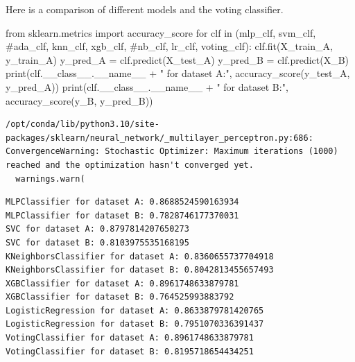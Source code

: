 \documentclass[
  letterpaper,
  DIV=11,
  numbers=noendperiod]{scrartcl}
\newenvironment{Shaded}{\begin{snugshade}}{\end{snugshade}}
\newcommand{\BuiltInTok}[1]{\textcolor[rgb]{0.00,0.23,0.31}{#1}}
\newcommand{\CommentTok}[1]{\textcolor[rgb]{0.37,0.37,0.37}{#1}}
\newcommand{\ControlFlowTok}[1]{\textcolor[rgb]{0.00,0.23,0.31}{#1}}
\newcommand{\ImportTok}[1]{\textcolor[rgb]{0.00,0.46,0.62}{#1}}
\newcommand{\KeywordTok}[1]{\textcolor[rgb]{0.00,0.23,0.31}{#1}}
\newcommand{\NormalTok}[1]{\textcolor[rgb]{0.00,0.23,0.31}{#1}}
\newcommand{\OperatorTok}[1]{\textcolor[rgb]{0.37,0.37,0.37}{#1}}
\newcommand{\StringTok}[1]{\textcolor[rgb]{0.13,0.47,0.30}{#1}}
\newcommand{\VariableTok}[1]{\textcolor[rgb]{0.07,0.07,0.07}{#1}}
\begin{document}
Here is a comparison of different models and the voting classifier.

\begin{Shaded}
\begin{Highlighting}[]
\ImportTok{from}\NormalTok{ sklearn.metrics }\ImportTok{import}\NormalTok{ accuracy\_score}
\ControlFlowTok{for}\NormalTok{ clf }\KeywordTok{in}\NormalTok{ (mlp\_clf, svm\_clf, }\CommentTok{\#ada\_clf,}
\NormalTok{            knn\_clf, xgb\_clf, }\CommentTok{\#nb\_clf,}
\NormalTok{            lr\_clf, voting\_clf):}
\NormalTok{    clf.fit(X\_train\_A, y\_train\_A)}
\NormalTok{    y\_pred\_A }\OperatorTok{=}\NormalTok{ clf.predict(X\_test\_A)}
\NormalTok{    y\_pred\_B }\OperatorTok{=}\NormalTok{ clf.predict(X\_B)}
    \BuiltInTok{print}\NormalTok{(clf.\_\_class\_\_.}\VariableTok{\_\_name\_\_} \OperatorTok{+} \StringTok{" for dataset A:"}\NormalTok{, accuracy\_score(y\_test\_A, y\_pred\_A))}
    \BuiltInTok{print}\NormalTok{(clf.\_\_class\_\_.}\VariableTok{\_\_name\_\_} \OperatorTok{+} \StringTok{" for dataset B:"}\NormalTok{, accuracy\_score(y\_B, y\_pred\_B))}
\end{Highlighting}
\end{Shaded}

\begin{verbatim}
/opt/conda/lib/python3.10/site-packages/sklearn/neural_network/_multilayer_perceptron.py:686: ConvergenceWarning: Stochastic Optimizer: Maximum iterations (1000) reached and the optimization hasn't converged yet.
  warnings.warn(
\end{verbatim}

\begin{verbatim}
MLPClassifier for dataset A: 0.8688524590163934
MLPClassifier for dataset B: 0.7828746177370031
SVC for dataset A: 0.8797814207650273
SVC for dataset B: 0.8103975535168195
KNeighborsClassifier for dataset A: 0.8360655737704918
KNeighborsClassifier for dataset B: 0.8042813455657493
XGBClassifier for dataset A: 0.8961748633879781
XGBClassifier for dataset B: 0.764525993883792
LogisticRegression for dataset A: 0.8633879781420765
LogisticRegression for dataset B: 0.7951070336391437
VotingClassifier for dataset A: 0.8961748633879781
VotingClassifier for dataset B: 0.8195718654434251
\end{verbatim}
\end{document}
